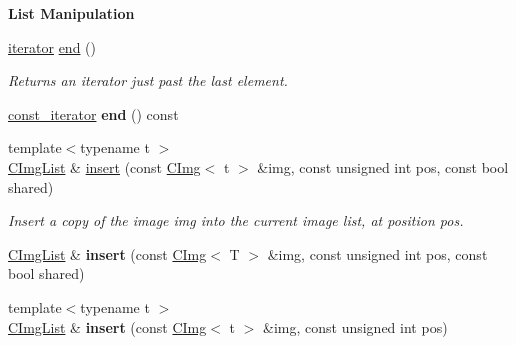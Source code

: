 \begin{Indent}{\bf List Manipulation}
\begin{DoxyCompactItemize}
\item 
\hypertarget{structcimg__library_1_1_c_img_list_a41500f2b029007607785b30a50de1f2d}{
\hyperlink{structcimg__library_1_1_c_img}{iterator} \hyperlink{structcimg__library_1_1_c_img_list_a41500f2b029007607785b30a50de1f2d}{end} ()}
\label{structcimg__library_1_1_c_img_list_a41500f2b029007607785b30a50de1f2d}

\begin{DoxyCompactList}\small\item\em Returns an iterator just past the last element. \item\end{DoxyCompactList}\item 
\hypertarget{structcimg__library_1_1_c_img_list_a9fcf4a4c2b8be7aa523b3e16fa00a391}{
\hyperlink{structcimg__library_1_1_c_img}{const\_\-iterator} {\bfseries end} () const }
\label{structcimg__library_1_1_c_img_list_a9fcf4a4c2b8be7aa523b3e16fa00a391}

\item 
\hypertarget{structcimg__library_1_1_c_img_list_aedbaab83c480227b6f4729e0d54909c5}{
{\footnotesize template$<$typename t $>$ }\\\hyperlink{structcimg__library_1_1_c_img_list}{CImgList} \& \hyperlink{structcimg__library_1_1_c_img_list_aedbaab83c480227b6f4729e0d54909c5}{insert} (const \hyperlink{structcimg__library_1_1_c_img}{CImg}$<$ t $>$ \&img, const unsigned int pos, const bool shared)}
\label{structcimg__library_1_1_c_img_list_aedbaab83c480227b6f4729e0d54909c5}

\begin{DoxyCompactList}\small\item\em Insert a copy of the image {\ttfamily img} into the current image list, at position {\ttfamily pos}. \item\end{DoxyCompactList}\item 
\hypertarget{structcimg__library_1_1_c_img_list_a9cbb72cdb95f3da3e99c0551a334f3b6}{
\hyperlink{structcimg__library_1_1_c_img_list}{CImgList} \& {\bfseries insert} (const \hyperlink{structcimg__library_1_1_c_img}{CImg}$<$ T $>$ \&img, const unsigned int pos, const bool shared)}
\label{structcimg__library_1_1_c_img_list_a9cbb72cdb95f3da3e99c0551a334f3b6}

\item 
\hypertarget{structcimg__library_1_1_c_img_list_af03327c53e11e2ed3b69149579faea79}{
{\footnotesize template$<$typename t $>$ }\\\hyperlink{structcimg__library_1_1_c_img_list}{CImgList} \& {\bfseries insert} (const \hyperlink{structcimg__library_1_1_c_img}{CImg}$<$ t $>$ \&img, const unsigned int pos)}
\label{structcimg__library_1_1_c_img_list_af03327c53e11e2ed3b69149579faea79}


\end{DoxyCompactItemize}
\end{Indent}
